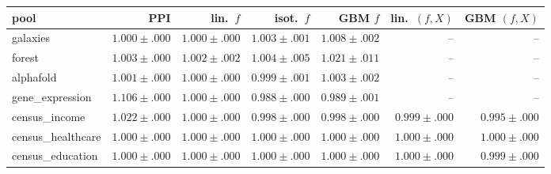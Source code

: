 \scriptsize\setlength{\tabcolsep}{3pt}\begin{tabular}{lrrrrrr}
\toprule
pool & PPI & lin.\ $f$ & isot.\ $f$ & GBM $f$ & lin.\ $(f,X)$ & GBM $(f,X)$ \\
\midrule
galaxies & $1.000{\pm}.000$ & $1.000{\pm}.000$ & $1.003{\pm}.001$ & $1.008{\pm}.002$ & -- & -- \\
forest & $1.003{\pm}.000$ & $1.002{\pm}.002$ & $1.004{\pm}.005$ & $1.021{\pm}.011$ & -- & -- \\
alphafold & $1.001{\pm}.000$ & $1.000{\pm}.000$ & $0.999{\pm}.001$ & $1.003{\pm}.002$ & -- & -- \\
gene\_expression & $1.106{\pm}.000$ & $1.000{\pm}.000$ & $0.988{\pm}.000$ & $0.989{\pm}.001$ & -- & -- \\
census\_income & $1.022{\pm}.000$ & $1.000{\pm}.000$ & $0.998{\pm}.000$ & $0.998{\pm}.000$ & $0.999{\pm}.000$ & $0.995{\pm}.000$ \\
census\_healthcare & $1.000{\pm}.000$ & $1.000{\pm}.000$ & $1.000{\pm}.000$ & $1.000{\pm}.000$ & $1.000{\pm}.000$ & $1.000{\pm}.000$ \\
census\_education & $1.000{\pm}.000$ & $1.000{\pm}.000$ & $1.000{\pm}.000$ & $1.000{\pm}.000$ & $1.000{\pm}.000$ & $0.999{\pm}.000$ \\
\bottomrule
\end{tabular}
